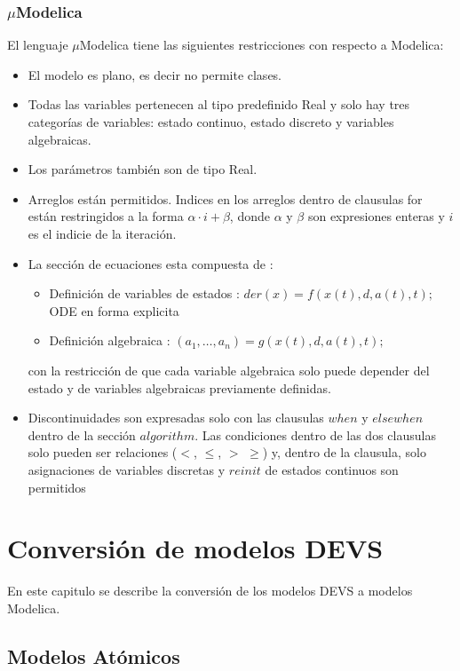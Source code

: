 \documentclass[a4paper,	11pt]{report}
\begin{document}
\subsection{$\mu$Modelica}
El lenguaje $\mu$Modelica tiene las siguientes restricciones con respecto a Modelica:

\begin{itemize}
 \item El modelo es plano, es decir no permite clases.
 \item Todas las variables pertenecen al tipo predefinido Real y solo hay tres categorías de variables: estado continuo, estado discreto y variables algebraicas.
 \item Los parámetros también son de tipo Real. 
 \item Arreglos están permitidos. Indices en los arreglos dentro de clausulas for están restringidos a la forma $\alpha \cdot i + \beta$, donde $\alpha$ y $\beta$ son expresiones enteras y $i$ es el indicie de la iteración.
 \item La sección de ecuaciones esta compuesta de :
 \begin{itemize}
	\item Definición de variables de estados : $der(x) =  f (x(t), d, a(t), t);$ ODE en forma explicita
	\item Definición algebraica : $(a_1 , \dots , a_n ) = g(x(t), d, a(t), t);$
 \end{itemize}
 con la restricción de que cada variable algebraica solo puede depender del estado y de variables algebraicas previamente definidas.
 
 \item Discontinuidades son expresadas solo con las clausulas $when$ y $elsewhen$ dentro de la sección $algorithm$. Las condiciones dentro de las dos clausulas solo pueden ser relaciones ($<$, $\leqslant$, $>$ $\geqslant$) y, dentro de la clausula, solo asignaciones de variables discretas y $reinit$ de estados continuos son permitidos
\end{itemize}


\chapter{Conversión de modelos DEVS}

En este capitulo se describe la conversión de los modelos DEVS a modelos Modelica.

\section{Modelos Atómicos}
\end{document}

